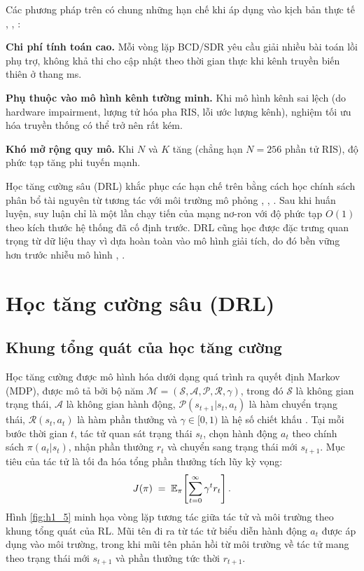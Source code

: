 Các phương pháp trên có chung những hạn chế khi áp dụng vào kịch bản
thực tế \cite{noman2026drl6g}, \cite{hieu2021optimal}, \cite{irkicatal2024deep}:

\textbf{Chi phí tính toán cao.} Mỗi vòng lặp BCD/SDR yêu cầu giải nhiều
bài toán lồi phụ trợ, không khả thi cho cập nhật theo thời gian thực khi
kênh truyền biến thiên ở thang ms.

\textbf{Phụ thuộc vào mô hình kênh tường minh.} Khi mô hình kênh sai
lệch (do hardware impairment, lượng tử hóa pha RIS, lỗi ước lượng kênh),
nghiệm tối ưu hóa truyền thống có thể trở nên rất kém.

\textbf{Khó mở rộng quy mô.} Khi $N$ và $K$ tăng (chẳng hạn $N=256$ phần
tử RIS), độ phức tạp tăng phi tuyến mạnh.

Học tăng cường sâu (DRL) khắc phục các hạn chế trên bằng cách học
chính sách phân bổ tài nguyên từ tương tác với môi trường mô phỏng
\cite{sutton2018reinforcement}, \cite{mnih2015human}, \cite{lillicrap2016continuous}.
Sau khi huấn luyện, suy luận chỉ là một lần chạy tiến của mạng nơ-ron với
độ phức tạp $O(1)$ theo kích thước hệ thống đã cố định trước. DRL cũng
học được đặc trưng quan trọng từ dữ liệu thay vì dựa hoàn toàn vào mô
hình giải tích, do đó bền vững hơn trước nhiễu mô hình
\cite{diamanti2023energy}, \cite{faramarzi2024meta}.

\section{Học tăng cường sâu (DRL)}
\label{sec:drl}

\subsection{Khung tổng quát của học tăng cường}

Học tăng cường được mô hình hóa dưới dạng quá trình ra quyết định Markov
(MDP), được mô tả bởi bộ năm
$\mathcal{M} = (\mathcal{S}, \mathcal{A}, \mathcal{P}, \mathcal{R}, \gamma)$,
trong đó $\mathcal{S}$ là không gian trạng thái, $\mathcal{A}$ là không
gian hành động, $\mathcal{P}(s_{t+1} | s_t, a_t)$ là hàm chuyển trạng
thái, $\mathcal{R}(s_t, a_t)$ là hàm phần thưởng và $\gamma \in [0,1)$ là
hệ số chiết khấu \cite{sutton2018reinforcement}. Tại mỗi bước thời gian
$t$, tác tử quan sát trạng thái $s_t$, chọn hành động $a_t$ theo chính
sách $\pi(a_t | s_t)$, nhận phần thưởng $r_t$ và chuyển sang trạng thái
mới $s_{t+1}$. Mục tiêu của tác tử là tối đa hóa tổng phần thưởng tích lũy
kỳ vọng:
\begin{equation}
  J(\pi) \;=\; \mathbb{E}_\pi\!\left[\sum_{t=0}^{\infty} \gamma^t r_t\right].
  \label{eq:rl_objective}
\end{equation}
Hình \ref{fig:h1_5} minh họa vòng lặp tương tác giữa tác tử và môi trường
theo khung tổng quát của RL. Mũi tên đi ra từ tác tử biểu diễn hành động
$a_t$ được áp dụng vào môi trường, trong khi mũi tên phản hồi từ môi
trường về tác tử mang theo trạng thái mới $s_{t+1}$ và phần thưởng tức
thời $r_{t+1}$.

